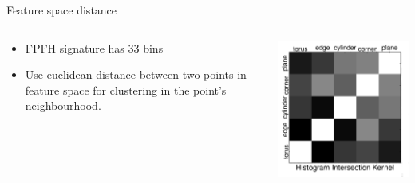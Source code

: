 \documentclass{beamer}
\begin{document}
\begin{frame}{Feature space distance}

\begin{columns}[T]

\begin{column}{0.5\textwidth}

\begin{itemize}
\item FPFH signature has 33 bins
\item Use euclidean distance between two points in feature space for clustering in the point's neighbourhood.
\end{itemize}  

\end{column}

\begin{column}{0.5\textwidth}

\includegraphics[width=1\textwidth]{pics/fpfh.png}

\end{column}

\end{columns}

\end{frame}
\end{document}
